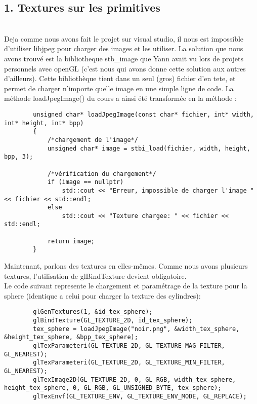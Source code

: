 \documentclass[11pt]{article}
\begin{document}
    \vspace{\baselineskip}
    
    \subsection*{1. Textures sur les primitives}
    \\
    Deja comme nous avons fait le projet sur visual studio, il nous est impossible d'utiliser libjpeg pour charger des images et les utiliser. La solution que nous avons trouvé est la bibliotheque stb\_image que Yann avait vu lors de projets personnels avec openGL (c'est nous qui avons donne cette solution aux autres d'ailleurs). Cette bibliothèque tient dans un seul (gros) fichier d'en tete, et permet de charger n'importe quelle image en une simple ligne de code.
    La méthode loadJpegImage() du cours a ainsi été transformée en la méthode :
    \begin{lstlisting}
        unsigned char* loadJpegImage(const char* fichier, int* width, int* height, int* bpp)
        {
            /*chargement de l'image*/
            unsigned char* image = stbi_load(fichier, width, height, bpp, 3);
        
            /*vérification du chargement*/
            if (image == nullptr)
                std::cout << "Erreur, impossible de charger l'image " << fichier << std::endl;
            else
                std::cout << "Texture chargee: " << fichier << std::endl;
        
            return image;
        }
    \end{lstlisting}
    
    \vspace{\baselineskip}
    
    Maintenant, parlons des textures en elles-mêmes. Comme nous avons plusieurs textures, l'utilisation de glBindTexture devient obligatoire.
    \\
    Le code suivant represente le chargement et paramétrage de la texture pour la sphere (identique a celui pour charger la texture des cylindres):
    \begin{lstlisting}
        glGenTextures(1, &id_tex_sphere);
        glBindTexture(GL_TEXTURE_2D, id_tex_sphere);
        tex_sphere = loadJpegImage("noir.png", &width_tex_sphere, &height_tex_sphere, &bpp_tex_sphere);
        glTexParameteri(GL_TEXTURE_2D, GL_TEXTURE_MAG_FILTER, GL_NEAREST);
        glTexParameteri(GL_TEXTURE_2D, GL_TEXTURE_MIN_FILTER, GL_NEAREST);
        glTexImage2D(GL_TEXTURE_2D, 0, GL_RGB, width_tex_sphere, height_tex_sphere, 0, GL_RGB, GL_UNSIGNED_BYTE, tex_sphere);
        glTexEnvf(GL_TEXTURE_ENV, GL_TEXTURE_ENV_MODE, GL_REPLACE);
    \end{lstlisting}
    
\end{document}
